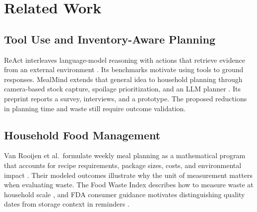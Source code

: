 \section{Related Work}
\subsection{Tool Use and Inventory-Aware Planning}
ReAct interleaves language-model reasoning with actions that retrieve evidence from an external environment \cite{yao2023}. Its benchmarks motivate using tools to ground responses. MealMind extends that general idea to household planning through camera-based stock capture, spoilage prioritization, and an LLM planner \cite{mealmind2025}. Its preprint reports a survey, interviews, and a prototype. The proposed reductions in planning time and waste still require outcome validation.

\subsection{Household Food Management}
Van Rooijen et al.\ formulate weekly meal planning as a mathematical program that accounts for recipe requirements, package sizes, costs, and environmental impact \cite{rooijen2024}. Their modeled outcomes illustrate why the unit of measurement matters when evaluating waste. The Food Waste Index describes how to measure waste at household scale \cite{unep2024}, and FDA consumer guidance motivates distinguishing quality dates from storage context in reminders \cite{fdafoodwaste}.

